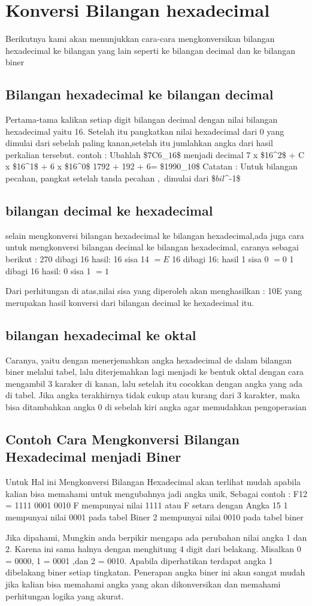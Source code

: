 \section{Konversi Bilangan hexadecimal}
Berikutnya kami akan menunjukkan cara-cara mengkonversikan bilangan hexadecimal ke bilangan yang lain seperti ke bilangan decimal dan ke bilangan biner
\subsection{Bilangan hexadecimal ke bilangan decimal}
Pertama-tama kalikan setiap digit bilangan decimal dengan nilai bilangan hexadecimal yaitu 16. Setelah itu pangkatkan nilai hexadecimal dari 0 yang dimulai dari sebelah paling kanan,setelah itu jumlahkan angka dari hasil perkalian tersebut.
contoh : 
Ubahlah \$7C6_\(16\)\$ menjadi decimal
		7 x \$16^2\$ + C x \$16^1\$ + 6 x \$16^0\$
		1792 + 192 + 6= \$1990_\(10\)\$
Catatan : Untuk bilangan pecahan, pangkat setelah tanda pecahan \(,\) dimulai dari \$\(bil\)^-1\$
\subsection{bilangan decimal ke hexadecimal}
selain mengkonversi bilangan hexadecimal ke bilangan hexadecimal,ada juga cara untuk mengkonversi bilangan decimal ke bilangan hexadecimal,
caranya sebagai berikut :
270 dibagi 16 hasil: 16 sisa 14 \(=E\)
16 dibagi 16: hasil 1 sisa 0 \( =0 \)
1 dibagi 16 hasil: 0 sisa 1 \( =1 \) 

Dari perhitungan di atas,nilai sisa yang diperoleh akan menghasilkan : 10E yang merupakan hasil konversi dari bilangan decimal ke hexadecimal itu.

\subsection{bilangan hexadecimal ke oktal}
Caranya, yaitu dengan menerjemahkan angka hexadecimal de dalam bilangan biner melalui tabel, lalu diterjemahkan lagi menjadi ke bentuk oktal dengan cara mengambil 3 karaker di kanan, lalu setelah itu cocokkan dengan angka yang ada di tabel. Jika angka terakhirnya tidak cukup atau kurang dari 3 karakter, maka bisa ditambahkan angka 0 di sebelah kiri angka agar memudahkan pengoperasian

\subsection{Contoh Cara Mengkonversi Bilangan Hexadecimal menjadi Biner}
 Untuk Hal ini Mengkonversi Bilangan Hexadecimal akan terlihat mudah apabila kalian bisa memahami untuk mengubahnya jadi angka unik, Sebagai contoh :
 F12 = 1111 0001 0010
 F mempunyai nilai 1111 atau F setara dengan Angka 15
 1 mempunyai nilai 0001 pada tabel Biner
 2 mempunyai nilai 0010 pada tabel biner
 
 Jika dipahami, Mungkin anda berpikir mengapa ada perubahan nilai angka 1 dan 2. Karena ini sama halnya dengan menghitung 4 digit dari belakang.
 Misalkan 0 = 0000, 1 = 0001 ,dan 2 = 0010. Apabila diperhatikan terdapat angka 1 dibelakang biner setiap tingkatan. Penerapan angka biner ini
 akan sangat mudah jika kalian bisa memahami angka yang akan dikonversikan dan memahami perhitungan logika yang akurat.